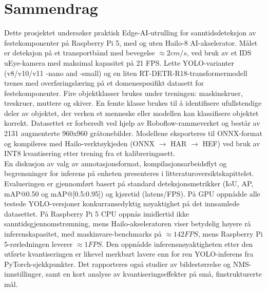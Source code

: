 \documentclass[12pt,a4paper]{report}
\begin{document}
\begin{otherlanguage}{norwegian}
\chapter*{Sammendrag}
Dette prosjektet undersøker praktisk Edge-AI-utrulling for sanntidsdeteksjon av
festekomponenter på
Raspberry Pi 5, med og uten Hailo-8 AI-akselerator. Målet er deteksjon på et
transportbånd med bevegelse \( \approx 2 cm/s\), ved bruk av et IDS uEye-kamera med maksimal kapasitet på 21 FPS.
Lette YOLO-varianter (v8/v10/v11 -nano and -small) og en liten RT-DETR-R18-transformermodell
trenes med overføringslæring på et domenespesifikt datasett for festekomponenter.
Fire objektklasser brukes under treningen: maskinskruer, treskruer, muttere
og skiver. En femte klasse brukes til å identifisere ufullstendige deler av objektet, der verken
et menneske eller modellen kan klassifisere objektet korrekt. Datasettet er forberedt ved hjelp av Roboflow-rammeverket og består av 2131 augmenterte
960x960 gråtonebilder. Modellene eksporteres til ONNX-format og kompileres med Hailo-verktøykjeden
(ONNX \(\to\) HAR \(\to\) HEF) ved bruk av INT8 kvantisering etter trening fra et kalibreringssett. \\
En diskusjon av valg av annotasjonsformat, kompilasjonsarbeidsflyt og begrensninger for inferens på enheten
presenteres i litteraturoversiktskapittelet. \\
Evalueringen er gjennomført basert på standard deteksjonsmetrikker
(IoU, AP, mAP@0.50 og mAP@[0.5:0.95]) og kjøretid
(latens/FPS). På GPU oppnådde alle testede YOLO-versjoner konkurransedyktig nøyaktighet på det innsamlede datasettet.
På Raspberry Pi 5 CPU oppnås imidlertid ikke sanntidsgjennomstrømning, mens Hailo-akseleratoren viser betydelig
høyere rå inferenskapasitet, med maskinvare-benchmarks på \( \approx 142 FPS\), mens Raspberry Pi 5-rørledningen
leverer \( \approx 1 FPS\). Den oppnådde inferensnøyaktigheten etter
den utførte kvantiseringen er likevel merkbart lavere enn for ren YOLO-inferens fra PyTorch-sjekkpunkter.
Det rapporteres også studier av bildestørrelse og NMS-innstillinger, samt en kort analyse av kvantiseringseffekter på små,
finstrukturerte mål.
\end{otherlanguage}

\cleardoublepage
\begin{otherlanguage}{english}
    \tableofcontents
    \cleardoublepage
\end{otherlanguage}
\end{document}
